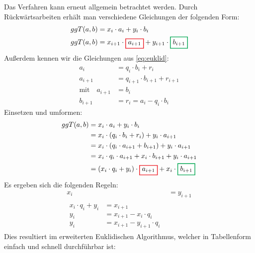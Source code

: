 \noindent
Das Verfahren kann erneut allgemein betrachtet werden. Durch Rückwärtsarbeiten erhält
man verschiedene Gleichungen der folgenden Form:
\begin{align*}
  \ggt{a}{b} & = x_i \cdot a_i + y_i \cdot b_i                                           \\
  \ggt{a}{b} & = x_{i+1} \cdot \hl{Red}{$a_{i+1}$} + y_{i+1} \cdot \hl{Green}{$b_{i+1}$}
\end{align*}
Außerdem kennen wir die Gleichungen aus \eqref{eq:euklid}:
\begin{align*}
  a_i                      & = q_i \cdot b_i + r_i             \\
  a_{i+1}                  & = q_{i+1} \cdot b_{i+1} + r_{i+1} \\
  \text{mit} \quad a_{i+1} & = b_i                             \\
  b_{i+1}                  & = r_i = a_i - q_i \cdot b_i
\end{align*}
Einsetzen und umformen:
\begin{align*}
  \ggt{a}{b} & = x_i \cdot a_i + y_i \cdot b_i                                                     \\
             & = x_i \cdot (q_i \cdot b_i + r_i) + y_i \cdot a_{i+1}                               \\
             & = x_i \cdot (q_i \cdot a_{i+1} + b_{i+1}) + y_i \cdot a_{i+1}                       \\
             & = x_i \cdot q_i \cdot a_{i+1} + x_i \cdot b_{i+1} + y_i \cdot a_{i+1}               \\
             & = (x_i \cdot q_i + y_i) \cdot \hl{Red}{$a_{i+1}$} + x_i \cdot \hl{Green}{$b_{i+1}$}
\end{align*}
Es ergeben sich die folgenden Regeln:
\begin{align}
  x_i & = y_{i+1} \\
  \begin{split}
    x_i \cdot q_i + y_i &= x_{i+1} \\
    y_i &= x_{i+1} - x_i \cdot q_i \\
    y_i &= x_{i+1} - y_{i+1} \cdot q_i
  \end{split}
\end{align}
Dies resultiert im erweiterten Euklidischen Algorithmus, welcher in Tabellenform
einfach und schnell durchführbar ist:

